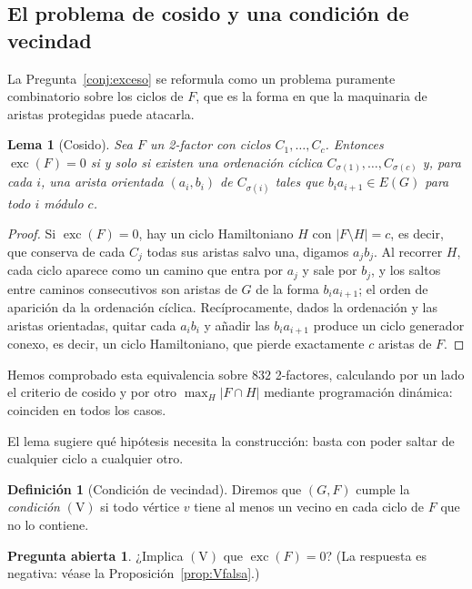 \documentclass[11pt,a4paper]{article}
\newtheorem{lema}[teorema]{Lema}
\theoremstyle{definition}
\newtheorem{definicion}[teorema]{Definición}
\newtheorem{pregunta}[teorema]{Pregunta abierta}
\theoremstyle{remark}
\begin{document}
\subsection{El problema de cosido y una condición de vecindad}\label{sub:cosido}

La Pregunta~\ref{conj:exceso} se reformula como un problema puramente combinatorio sobre los ciclos de $F$, que es la forma en que la maquinaria de aristas protegidas puede atacarla.

\begin{lema}[Cosido]\label{lem:cosido}
Sea $F$ un 2-factor con ciclos $C_1,\dots,C_c$. Entonces $\operatorname{exc}(F)=0$ si y solo si existen una ordenación cíclica $C_{\sigma(1)},\dots,C_{\sigma(c)}$ y, para cada $i$, una arista orientada $(a_i,b_i)$ de $C_{\sigma(i)}$ tales que $b_ia_{i+1}\in E(G)$ para todo $i$ módulo $c$.
\end{lema}

\begin{proof}
Si $\operatorname{exc}(F)=0$, hay un ciclo Hamiltoniano $H$ con $|F\setminus H|=c$, es decir, que conserva de cada $C_j$ todas sus aristas salvo una, digamos $a_jb_j$. Al recorrer $H$, cada ciclo aparece como un camino que entra por $a_j$ y sale por $b_j$, y los saltos entre caminos consecutivos son aristas de $G$ de la forma $b_ia_{i+1}$; el orden de aparición da la ordenación cíclica. Recíprocamente, dados la ordenación y las aristas orientadas, quitar cada $a_ib_i$ y añadir las $b_ia_{i+1}$ produce un ciclo generador conexo, es decir, un ciclo Hamiltoniano, que pierde exactamente $c$ aristas de $F$.
\end{proof}

Hemos comprobado esta equivalencia sobre $832$ 2-factores, calculando por un lado el criterio de cosido y por otro $\max_H|F\cap H|$ mediante programación dinámica: coinciden en todos los casos.

El lema sugiere qué hipótesis necesita la construcción: basta con poder saltar de cualquier ciclo a cualquier otro.

\begin{definicion}[Condición de vecindad]
Diremos que $(G,F)$ cumple la \emph{condición} $(\mathrm{V})$ si todo vértice $v$ tiene al menos un vecino en cada ciclo de $F$ que no lo contiene.
\end{definicion}

\begin{pregunta}\label{conj:V}
¿Implica $(\mathrm{V})$ que $\operatorname{exc}(F)=0$? (La respuesta es negativa: véase la Proposición~\ref{prop:Vfalsa}.)
\end{pregunta}
\end{document}
